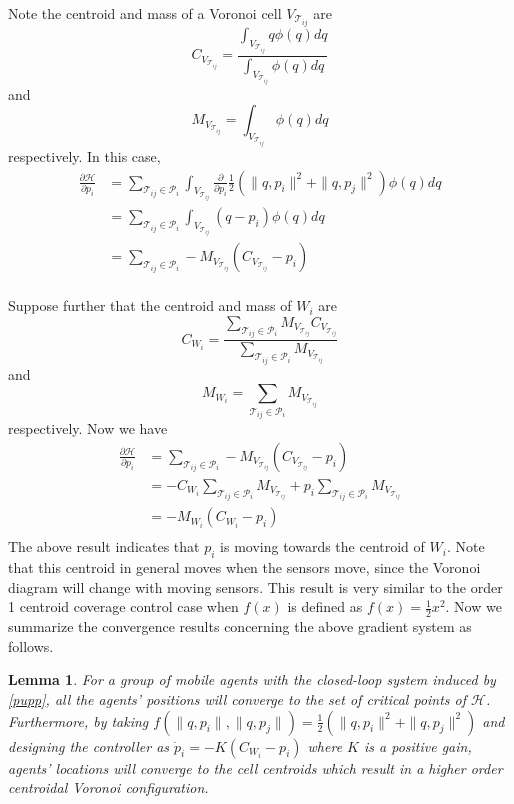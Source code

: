 \documentclass[letterpaper, 10 pt, conference]{ieeeconf}
\newtheorem{lemma}{Lemma}
\begin{document}
Note the centroid and mass of a Voronoi cell $V_{\mathcal{T}_{ij}}$ are
$$C_{V_{\mathcal{T}_{ij}}}=\frac{\int_{V_{\mathcal{T}_{ij}}}q\phi(q)dq}{\int_{V_{\mathcal{T}_{ij}}}\phi(q)dq}$$
and $${M}_{V_{\mathcal{T}_{ij}}}=\int_{V_{\mathcal{T}_{ij}}}\phi(q)dq$$ respectively.
In this case,
\begin{equation}\label{puppcentroid}
\begin{split}
\frac{\partial \mathcal{H}}{\partial {p_i}}&=\sum_{\mathcal{T}_{ij}\in \mathcal{P}_i}
\int_{V_{\mathcal{T}_{ij}}}\frac{\partial}{\partial {p_i}}\frac{1}{2}(\|q,p_i\|^2 + \|q,p_j\|^2) \phi(q) dq\\
&=\sum_{\mathcal{T}_{ij}\in \mathcal{P}_i}\int_{V_{\mathcal{T}_{ij}}}(q-p_i)\phi(q)dq\\
&=\sum_{\mathcal{T}_{ij}\in \mathcal{P}_i}-{M}_{V_{\mathcal{T}_{ij}}}(C_{V_{\mathcal{T}_{ij}}}-p_i)\\
\end{split}
\end{equation}

Suppose further that the centroid and mass of $W_i$ are
$$C_{W_i}=\frac{\sum_{\mathcal{T}_{ij}\in \mathcal{P}_i}{M}_{V_{\mathcal{T}_{ij}}}C_{V_{\mathcal{T}_{ij}}}}{\sum_{\mathcal{T}_{ij}\in \mathcal{P}_i}{M}_{V_{\mathcal{T}_{ij}}}}$$
and $${M}_{W_i}=\sum_{\mathcal{T}_{ij}\in \mathcal{P}_i}{M}_{V_{\mathcal{T}_{ij}}}$$ respectively.
Now we have
\begin{equation}\label{puppcentroidW}
\begin{split}
\frac{\partial \mathcal{H}}{\partial {p_i}}&=\sum_{\mathcal{T}_{ij}\in \mathcal{P}_i}-{M}_{V_{\mathcal{T}_{ij}}}(C_{V_{\mathcal{T}_{ij}}}-p_i)\\
&=-C_{W_i}\sum_{\mathcal{T}_{ij}\in \mathcal{P}_i}{M}_{V_{\mathcal{T}_{ij}}}+p_i\sum_{\mathcal{T}_{ij}\in \mathcal{P}_i}{M}_{V_{\mathcal{T}_{ij}}}\\
&=-{M}_{W_i}(C_{W_i}-p_i)\\
\end{split}
\end{equation}
The above result indicates that $p_i$ is moving towards the centroid of $W_i$.
Note that this centroid in general moves when the sensors move, since the Voronoi diagram will change with moving sensors.
This result is very similar to the order 1 centroid coverage control case when $f(x)$ is defined as $f(x) = \frac{1}{2}x^2$. Now we summarize the convergence results concerning the above gradient system as follows.

\begin{lemma}
For a group of mobile agents with the closed-loop system induced by  \eqref{pupp}, all the agents' positions  will  converge to
the set of critical points of $\mathcal{H}$. Furthermore, by taking $f(\|q,p_i\|,\|q,p_j\|)=\frac{1}{2}(\|q,p_i\|^2 + \|q,p_j\|^2)$ and designing the controller as $\dot p_i =-K(C_{W_i}-p_i)$ where $K$ is a positive gain, agents' locations will converge to the cell centroids which result in a higher order  centroidal  Voronoi configuration.
\end{lemma}
\end{document}
